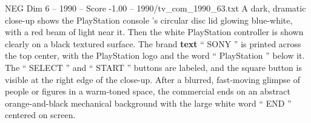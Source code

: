 \begin{textsample}{NEG Dim 6 – 1990 – Score -1.00 – 1990/tv\_com\_1990\_63.txt}
A dark, dramatic close-up shows the PlayStation console ’s circular disc lid glowing blue-white, with a red beam of light near it.
Then the white PlayStation controller is shown clearly on a black textured surface.
The brand \textbf{text} “ SONY ” is printed across the top center, with the PlayStation logo and the word “ PlayStation ” below it.
The “ SELECT ” and “ START ” buttons are labeled, and the square button is visible at the right edge of the close-up.
After a blurred, fast-moving glimpse of people or figures in a warm-toned space, the commercial ends on an abstract orange-and-black mechanical background with the large white word “ END ” centered on screen.

\end{textsample}
